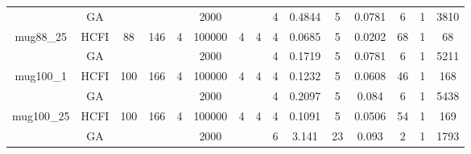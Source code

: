 \documentclass[10pt]{article}
\begin{document}
\begin{center}
\begin{table}[H]
\begin{tabular}{|c|c|c|c|c|c|c|c|c|c|c|c|c|c|c|}
	&GA&       &                   &                     &2000         &     \cellcolor{yellow} & {\cellcolor{yellow}}& {{\cellcolor{green}4}}
&0.4844    &5        &0.0781                   &6                    &1          &3810        \\ \cline{2-2} \cline{6-6} \cline{9-15}
 \multirow{-2}{*}{mug88\_25} &HCFI   &\multirow{-2}{*}{88}   &\multirow{-2}{*}{146}     &\multirow{-2}{*}{4}     &100000     &\multirow{-2}{*}{\cellcolor{yellow}4}      & \multirow{-2}{*}{\cellcolor{yellow}4}    &{\cellcolor{green}4}     &0.0685          &5    & 0.0202         &68    &    1 &68        \\ \hline \hline
	&GA&       &                   &                     &2000         &     \cellcolor{yellow} & {\cellcolor{yellow}}& {{\cellcolor{green}4}}
&0.1719   &5        & 0.0781                   & 6                   & 1         &5211         \\ \cline{2-2} \cline{6-6} \cline{9-15}
 \multirow{-2}{*}{mug100\_1} &HCFI   &\multirow{-2}{*}{100}   &\multirow{-2}{*}{166}     &\multirow{-2}{*}{4}     &100000     &\multirow{-2}{*}{\cellcolor{yellow}4}      & \multirow{-2}{*}{\cellcolor{yellow}4}    &{\cellcolor{green}4}     &0.1232         &5    &0.0608         &46    &1     &168        \\ \hline \hline
	&GA&       &                   &                     &2000         &     \cellcolor{yellow} & {\cellcolor{yellow}}& {{\cellcolor{green}4}}
&0.2097   &5        &0.084                   & 6                   &1          &5438        \\ \cline{2-2} \cline{6-6} \cline{9-15}
 \multirow{-2}{*}{mug100\_25} &HCFI   &\multirow{-2}{*}{100}   &\multirow{-2}{*}{166}     &\multirow{-2}{*}{4}     &100000     &\multirow{-2}{*}{\cellcolor{yellow}4}      & \multirow{-2}{*}{\cellcolor{yellow}4}    &{\cellcolor{green}4}     &0.1091         &5    &0.0506         &54   &1     &169        \\ \hline \hline
	&GA&       &                   &                     & 2000        &     \cellcolor{yellow} & {\cellcolor{yellow}}& {{\cellcolor{green}6}}
&3.141   &23        &0.093                   &2                    &1          &1793        \\ \cline{2-2} \cline{6-6} \cline{9-15}

\end{tabular}
\end{table}
\end{center}
\end{document}
